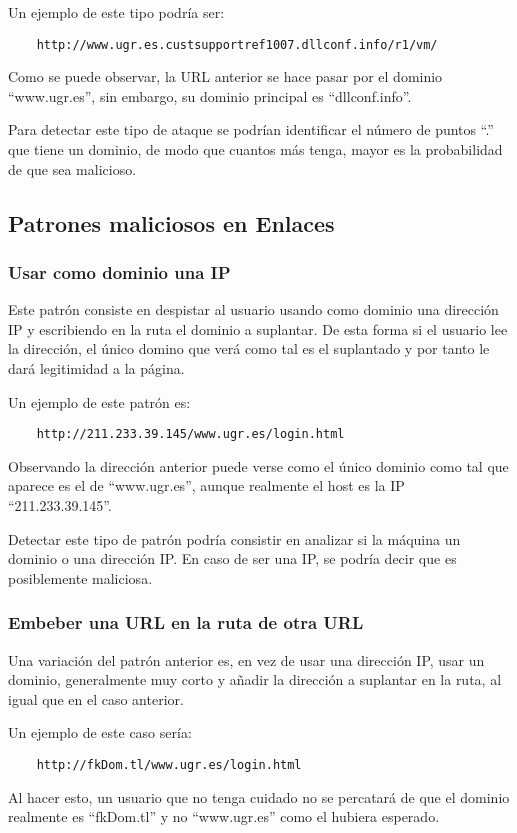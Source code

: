 Un ejemplo de este tipo podría ser: 
\begin{verbatim}
    http://www.ugr.es.custsupportref1007.dllconf.info/r1/vm/
\end{verbatim}
Como se puede observar, la URL anterior se hace pasar por el dominio “www.ugr.es”, sin embargo, su dominio principal es “dllconf.info”.

Para detectar este tipo de ataque se podrían identificar el número de puntos “.” que tiene un dominio, de modo que cuantos más tenga, mayor es la probabilidad de que sea malicioso.

\subsection{Patrones maliciosos en Enlaces}
\subsubsection{Usar como dominio una IP}
Este patrón consiste en despistar al usuario usando como dominio una dirección IP y escribiendo en la ruta el dominio a suplantar. De esta forma si el usuario lee la dirección, el único domino que verá como tal es el suplantado y por tanto le dará legitimidad a la página. 

Un ejemplo de este patrón es: 
\begin{verbatim}
    http://211.233.39.145/www.ugr.es/login.html 
\end{verbatim}
Observando la dirección anterior puede verse como el único dominio como tal que aparece es el de “www.ugr.es”, aunque realmente el host es la IP “211.233.39.145”.

Detectar este tipo de patrón podría consistir en analizar si la máquina un dominio o una dirección IP. En caso de ser una IP, se podría decir que es posiblemente maliciosa. 

\subsubsection{Embeber una URL en la ruta de otra URL}
Una variación del patrón anterior es, en vez de usar una dirección IP, usar un dominio, generalmente muy corto y añadir la dirección a suplantar en la ruta, al igual que en el caso anterior.

Un ejemplo de este caso sería: 
\begin{verbatim}
    http://fkDom.tl/www.ugr.es/login.html 
\end{verbatim}
Al hacer esto, un usuario que no tenga cuidado no se percatará de que el dominio realmente es “fkDom.tl” y no “www.ugr.es” como el hubiera esperado. 


